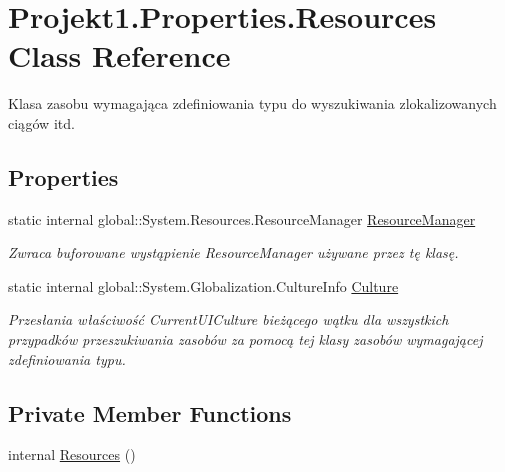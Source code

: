 \hypertarget{class_projekt1_1_1_properties_1_1_resources}{}\section{Projekt1.\+Properties.\+Resources Class Reference}
\label{class_projekt1_1_1_properties_1_1_resources}


Klasa zasobu wymagająca zdefiniowania typu do wyszukiwania zlokalizowanych ciągów itd.  


\subsection*{Properties}
\begin{DoxyCompactItemize}
\item 
static internal global\+::\+System.\+Resources.\+Resource\+Manager \mbox{\hyperlink{class_projekt1_1_1_properties_1_1_resources_a18fe528e3b790c571d6a238300f91c02}{Resource\+Manager}}
\begin{DoxyCompactList}\small\item\em Zwraca buforowane wystąpienie Resource\+Manager używane przez tę klasę. \end{DoxyCompactList}\item 
static internal global\+::\+System.\+Globalization.\+Culture\+Info \mbox{\hyperlink{class_projekt1_1_1_properties_1_1_resources_ab59ba363b95dcad50c46b73eb5ce71a2}{Culture}}
\begin{DoxyCompactList}\small\item\em Przesłania właściwość Current\+U\+I\+Culture bieżącego wątku dla wszystkich przypadków przeszukiwania zasobów za pomocą tej klasy zasobów wymagającej zdefiniowania typu. \end{DoxyCompactList}\end{DoxyCompactItemize}
\subsection*{Private Member Functions}
\begin{DoxyCompactItemize}
\item 
internal \mbox{\hyperlink{class_projekt1_1_1_properties_1_1_resources_af440d94500e352506b0fb2b91289ed59}{Resources}} ()
\end{DoxyCompactItemize}
